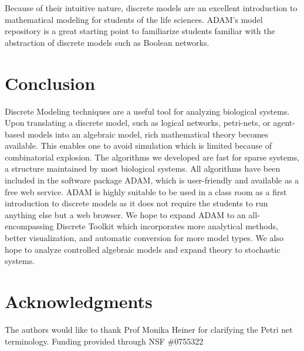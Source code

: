 \documentclass[11pt]{amsart}
\begin{document}
Because of their intuitive nature, discrete models are an excellent introduction to mathematical modeling for students of the life sciences. ADAM's model repository is a great starting point to familiarize students familiar with the abstraction of discrete models such as Boolean networks. 
\appendix
\section{Conclusion}
Discrete Modeling techniques are a useful tool for analyzing biological
systems. Upon translating a discrete model, such as logical networks,
petri-nets, or agent-based models into an algebraic model, rich mathematical
theory becomes available. This enables one to
avoid simulation which is limited because of combinatorial explosion. The algorithms 
we developed are fast for sparse systems, a structure maintained by most biological
systems. All algorithms have been included in the software package ADAM\cite{ADAM}, 
which is user-friendly and available as a free web service. 
ADAM is highly suitable to be used in a class room as a first
introduction to discrete models as it does not require the students to run
anything else but a web browser.
We hope to expand ADAM to an all-encompassing Discrete Toolkit which incorporates more 
analytical methods, better visualization, and automatic conversion for more model types. 
We also hope to analyze controlled algebraic models and expand theory to stochastic systems. 

\section*{Acknowledgments}
The authors would like to thank Prof Monika Heiner for clarifying the Petri
net terminology.
Funding provided through NSF \#0755322 

%

\end{document}
